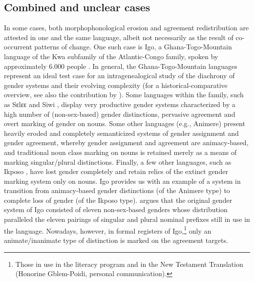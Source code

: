 \documentclass[output=collectionpaper]{langsci/langscibook}
\begin{document}
\subsection{Combined and unclear cases}
\label{subsec:combined}
In some cases, both morphophonological erosion and agreement redistribution are attested in one and the same language, albeit not necessarily as the result of co-occurrent patterns of change.
One such case is Igo, a Ghana-Togo-Mountain language of the Kwa subfamily of the Atlantic-Congo family, spoken by approximately 6.000 people \citep{Gblem-Poidi2007}. In general, the Ghana-Togo-Mountain languages represent an ideal test case for an intragenealogical study of the diachrony of gender systems and their evolving complexity (for a historical\hyp{}comparative overview, see also the contribution by ). Some languages within the family, such as Sɛlɛɛ \citep{Agbetsoamedo2014} and Siwi \citep{Dingemanse2009}, display very productive gender systems characterized by a high number of (non-sex-based) gender distinctions, pervasive agreement and overt marking of gender on nouns. Some other languages (e.g., Animere) present heavily eroded and completely semanticized systems of gender assignment and gender agreement, whereby gender assignment and agreement are animacy-based, and traditional noun class marking on nouns is retained merely as a means of marking singular/plural distinctions. Finally, a few other languages, such as Ikposo \citep{Soubrier2013}, have lost gender completely and retain relics of the extinct gender marking system only on nouns. Igo provides us with an example of a system in transition from animacy-based gender distinctions (of the Animere type) to complete loss of gender (of the Ikposo type).  \citet{Gblem-Poidi2007} argues that the original gender system of Igo consisted of eleven non-sex-based genders whose distribution paralleled the eleven pairings of singular and plural nominal prefixes still in use in the language. Nowadays, however, in formal registers of Igo,\footnote{Those in use in the literacy program and in the New Testament Translation (Honorine Gblem-Poidi, personal communication).} only an animate/inanimate type of distinction is marked on the agreement targets.
\end{document}
